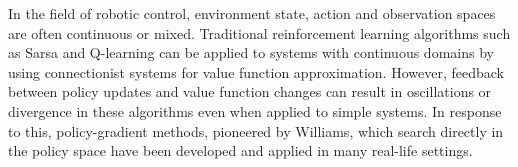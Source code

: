 In the field of robotic control, environment state, action and observation
spaces are often continuous or mixed.
Traditional reinforcement learning algorithms such as Sarsa and Q-learning can
be applied to systems with continuous domains by using connectionist systems
for value function approximation\cite{barto:neuron}. However, feedback
between policy updates and value function changes can result in oscillations
or divergence in these algorithms even when applied to simple
systems\cite{peters:enac}.  In response to this, policy-gradient methods,
pioneered by Williams\cite{williams:reinforce}, which search directly in the
policy space have been developed and applied in many real-life
settings\cite{barto:policy,shaal:robots,moody:direct,peshkin:routing}.

%

